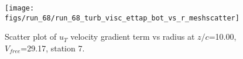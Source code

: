 \begin{figure}[H]
\centering
\texttt{[image: figs/run\_68/run\_68\_turb\_visc\_ettap\_bot\_vs\_r\_meshscatter]}
\caption{Scatter plot of $
u_T$ velocity gradient term vs radius at $z/c$=10.00, $V_{free}$=29.17, station 7.}
\end{figure}


